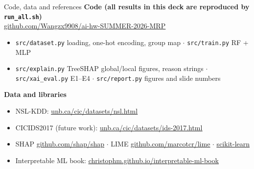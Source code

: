\documentclass[10pt,aspectratio=169]{beamer}
\newcommand{\f}[1]{{\small\texttt{#1}}}
\newcommand{\link}[2]{\href{#1}{\color{accent}\underline{#2}}}
\begin{document}
\begin{frame}{Code, data and references}
\small
\textbf{Code (all results in this deck are reproduced by \f{run\_all.sh})}\\
\link{https://github.com/Wangzx9908/ai-hw-SUMMER-2026-MRP}{github.com/Wangzx9908/ai-hw-SUMMER-2026-MRP}
\vspace{0.3em}
\scriptsize
\begin{itemize}\itemsep0pt
  \item \f{src/dataset.py} loading, one-hot encoding, group map $\cdot$
        \f{src/train.py} RF + MLP
  \item \f{src/explain.py} TreeSHAP global/local figures, reason strings $\cdot$
        \f{src/xai\_eval.py} E1--E4 $\cdot$ \f{src/report.py} figures and slide numbers
\end{itemize}

\vspace{0.5em}
\normalsize\textbf{Data and libraries}
\scriptsize
\begin{itemize}\itemsep0pt
  \item NSL-KDD: \link{https://www.unb.ca/cic/datasets/nsl.html}{unb.ca/cic/datasets/nsl.html}
  \item CICIDS2017 (future work): \link{https://www.unb.ca/cic/datasets/ids-2017.html}{unb.ca/cic/datasets/ids-2017.html}
  \item SHAP \link{https://github.com/shap/shap}{github.com/shap/shap} $\cdot$
        LIME \link{https://github.com/marcotcr/lime}{github.com/marcotcr/lime} $\cdot$
        \link{https://scikit-learn.org/}{scikit-learn}
  \item Interpretable ML book: \link{https://christophm.github.io/interpretable-ml-book/}{christophm.github.io/interpretable-ml-book}
\end{itemize}


\end{frame}
\end{document}
